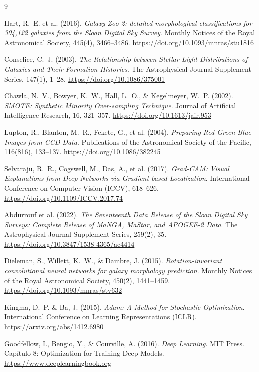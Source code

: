 \documentclass[12pt, a4paper]{article}
\begin{document}
\begin{thebibliography}{9}

Hart, R.~E. et al. (2016).
\textit{Galaxy Zoo 2: detailed morphological classifications for 304,122 galaxies from the Sloan Digital Sky Survey}.
Monthly Notices of the Royal Astronomical Society, 445(4), 3466--3486.
\url{https://doi.org/10.1093/mnras/stu1816}

Conselice, C.~J. (2003).
\textit{The Relationship between Stellar Light Distributions of Galaxies and Their Formation Histories}.
The Astrophysical Journal Supplement Series, 147(1), 1--28.
\url{https://doi.org/10.1086/375001}

Chawla, N.~V., Bowyer, K.~W., Hall, L.~O., \& Kegelmeyer, W.~P. (2002).
\textit{SMOTE: Synthetic Minority Over-sampling Technique}.
Journal of Artificial Intelligence Research, 16, 321--357.
\url{https://doi.org/10.1613/jair.953}

Lupton, R., Blanton, M.~R., Fekete, G., et al. (2004).
\textit{Preparing Red-Green-Blue Images from CCD Data}.
Publications of the Astronomical Society of the Pacific, 116(816), 133--137.
\url{https://doi.org/10.1086/382245}

Selvaraju, R.~R., Cogswell, M., Das, A., et al. (2017).
\textit{Grad-CAM: Visual Explanations from Deep Networks via Gradient-based Localization}.
International Conference on Computer Vision (ICCV), 618--626.
\url{https://doi.org/10.1109/ICCV.2017.74}

Abdurrouf et al. (2022).
\textit{The Seventeenth Data Release of the Sloan Digital Sky Surveys: Complete Release of MaNGA, MaStar, and APOGEE-2 Data}.
The Astrophysical Journal Supplement Series, 259(2), 35.
\url{https://doi.org/10.3847/1538-4365/ac4414}

Dieleman, S., Willett, K.~W., \& Dambre, J. (2015).
\textit{Rotation-invariant convolutional neural networks for galaxy morphology prediction}.
Monthly Notices of the Royal Astronomical Society, 450(2), 1441--1459.
\url{https://doi.org/10.1093/mnras/stv632}

Kingma, D.~P. \& Ba, J. (2015).
\textit{Adam: A Method for Stochastic Optimization}.
International Conference on Learning Representations (ICLR).
\url{https://arxiv.org/abs/1412.6980}

Goodfellow, I., Bengio, Y., \& Courville, A. (2016).
\textit{Deep Learning}.
MIT Press. Capítulo 8: Optimization for Training Deep Models.
\url{https://www.deeplearningbook.org}


\end{thebibliography}
\end{document}
